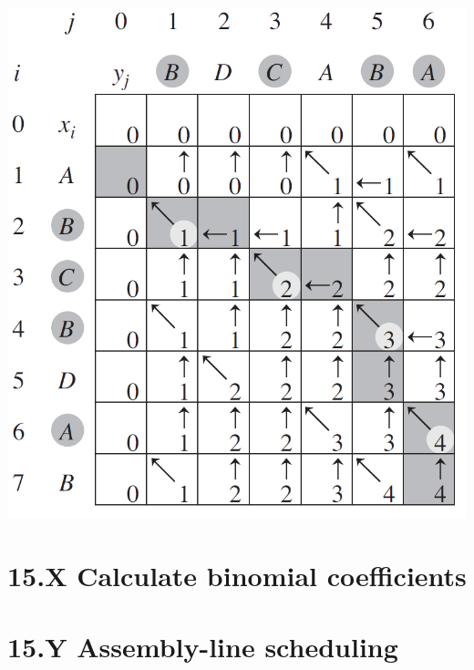 \documentclass[a4paper]{article}
\begin{document}
\begin{center}
    \includegraphics[scale=0.8]{"Longest common subsequence"}
\end{center}
\section*{15.X Calculate binomial coefficients}
\section*{15.Y Assembly-line scheduling}
\end{document}

